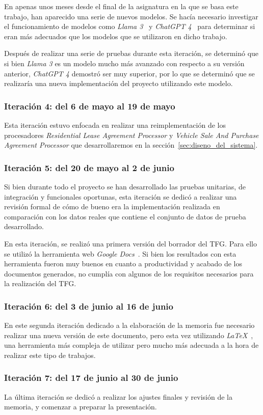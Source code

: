 En apenas unos meses desde el final de la asignatura en la que se basa este trabajo, han aparecido una serie de nuevos
modelos.
Se hacía necesario investigar el funcionamiento de modelos como \textit{Llama 3}~\cite{url_llama3} y
\textit{ChatGPT 4}~\cite{url_openai_gpt4} para determinar si eran más adecuados que los modelos que se utilizaron en
dicho trabajo.

Después de realizar una serie de pruebas durante esta iteración, se determinó que si bien \textit{Llama 3} es un
modelo mucho más avanzado con respecto a su versión anterior, \textit{ChatGPT 4} demostró ser muy superior, por lo que
se determinó que se realizaría una nueva implementación del proyecto utilizando este modelo.

\subsubsection*{Iteración 4: del 6 de mayo al 19 de mayo}

Esta iteración estuvo enfocada en realizar una reimplementación de los procesadores
\textit{Residential Lease Agreement Processor} y \textit{Vehicle Sale And Purchase Agreement Processor}
que desarrollaremos en la sección~\ref{sec:diseno_del_sistema}.

\subsubsection*{Iteración 5: del 20 de mayo al 2 de junio}

Si bien durante todo el proyecto se han desarrollado las pruebas unitarias, de integración y funcionales oportunas, esta
iteración se dedicó a realizar una revisión formal de cómo de bueno era la implementación realizada en comparación
con los datos reales que contiene el conjunto de datos de prueba desarrollado.

En esta iteración, se realizó una primera versión del borrador del TFG. Para ello se utilizó la herramienta web
\textit{Google Docs}~\cite{url_google_docs}.
Si bien los resultados con esta herramienta fueron muy buenos en cuanto a productividad y acabado de los documentos
generados, no cumplía con algunos de los requisitos necesarios para la realización del TFG.

\subsubsection*{Iteración 6: del 3 de junio al 16 de junio}

En este segunda iteración dedicado a la elaboración de la memoria fue necesario realizar una nueva versión de este
documento, pero esta vez utilizando \textit{LaTeX}~\cite{url_latex}, una herramienta más compleja de utilizar pero
mucho más adecuada a la hora de realizar este tipo de trabajos.

\subsubsection*{Iteración 7: del 17 de junio al 30 de junio}

La última iteración se dedicó a realizar los ajustes finales y revisión de la memoria, y comenzar a preparar la
presentación.
